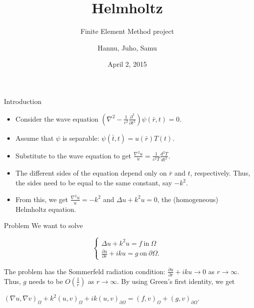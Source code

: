 \documentclass{beamer}
\title[Helmholtz]{Helmholtz}
\subtitle{Finite Element Method project}
\author{Hannu, Juho, Samu}
\date{April 2, 2015}
\begin{document}
\begin{frame}
\titlepage
\end{frame}

\begin{frame}{Introduction}
\begin{itemize}
\item Consider the wave equation $(\nabla^2 - \frac{1}{c^2} \frac{\partial^2}{\partial t^2})\psi(\bar{r}, t) = 0$. 
\item Assume that $\psi$ is separable: $\psi(\bar{t}, t) = u(\bar{r})T(t)$. 
\item Substitute to the wave equation to get $\frac{\nabla^2 u}{u} = \frac{1}{c^2 T} \frac{d^2 T}{dt^2}$. 
\item The different sides of the equation depend only on $\bar{r}$ and $t$, respectively. Thus, the sides need to be equal to the same constant, say $-k^2$.
\item From this, we get $\frac{\nabla^2 u}{u} = -k^2$ and $\Delta u + k^2 u = 0$, the (homogeneous) Helmholtz equation.
\end{itemize}
\end{frame}


\begin{frame}{Problem}
We want to solve
\begin{definition}
\[ \begin{cases}
\Delta u + k^2 u = f \ \mathrm{in} \ \Omega \\ \frac{\partial u}{\partial \bar{r}} + iku = g \ \mathrm{on} \ \partial \Omega.
\end{cases} \]
\end{definition}
The problem has the Sommerfeld radiation condition: $\frac{\partial u}{\partial \bar{r}} + iku \rightarrow 0$ as $r \rightarrow \infty$. Thus, $g$ needs to be $O(\frac{1}{r})$ as $r \rightarrow \infty$.
By using Green's first identity, we get \begin{definition}$(\nabla u, \nabla v)_{\Omega} + k^2(u, v)_{\Omega} + ik(u, v)_{\partial \Omega} = (f, v)_{\Omega} + (g, v)_{\partial \Omega}.$
\end{definition}
\end{frame}
\end{document}
